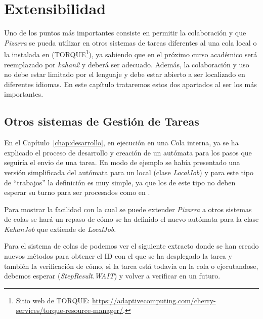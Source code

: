 \documentclass[11pt,spanish,listoffigures,listoftables]{tfgetsinf}
\begin{document}
\chapter{Extensibilidad}

Uno de los puntos más importantes consiste en permitir la colaboración y que \textit{Pizarra} se pueda utilizar en otros sistemas de tareas diferentes al una \Gls{cola} local o la instalada en \kahan (TORQUE\footnote{Sitio web de TORQUE: \url{https://adaptivecomputing.com/cherry-services/torque-resource-manager/}.}), ya sabiendo que en el próximo curso académico \kahan será reemplazado por \textit{kahan2} y deberá ser adecuado. Además, la colaboración y uso no debe estar limitado por el lenguaje y debe estar abierto a ser localizado en diferentes idiomas. En este capítulo trataremos estos dos apartados al ser los más importantes.

\section{Otros sistemas de Gestión de Tareas}

En el Capítulo~\ref{chap:desarrollo}, en ejecución en una Cola interna, ya se ha explicado el proceso de desarrollo y creación de un autómata para los pasos que seguiría el \gls{envio} de una \gls{tarea}. En modo de ejemplo se había presentado una versión simplificada del autómata para un  local (clase \textit{LocalJob}) y para este tipo de ``trabajos'' la definición es muy simple, ya que los  de este tipo no deben esperar su turno para ser procesados como en \kahan.

Para mostrar la facilidad con la cual se puede extender \textit{Pizarra} a otros sistemas de \gls{cola}s se hará un repaso de cómo se ha definido el nuevo autómata para la clase \textit{KahanJob} que extiende de \textit{LocalJob}.

Para el sistema de \Gls{cola}s de \kahan podemos ver el siguiente extracto donde se han creado nuevos métodos para obtener el ID con el que se ha desplegado la tarea y también la verificación de cómo, si la tarea está todavía en la \gls{cola} o ejecutandose, debemos esperar (\textit{StepResult.WAIT}) y volver a verificar en un futuro. \newline
\end{document}
